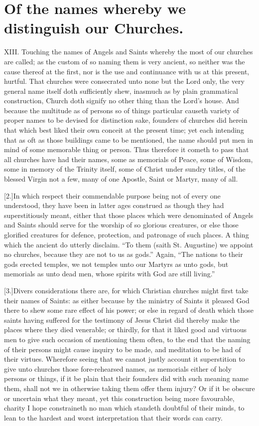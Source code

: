 \section*{Of the names whereby we distinguish our Churches.}
XIII. Touching the names of Angels and Saints whereby the most of our churches are called; as the custom of so naming them is very ancient, so neither was the cause thereof at the first, nor is the use and continuance with us at this present, hurtful. That churches were consecrated unto none but the Lord only, the very general name itself doth sufficiently shew, inasmuch as by plain grammatical construction, Church doth signify no other thing than the Lord’s house. And because the multitude as of persons so of things particular causeth variety of proper names to be devised for distinction sake, founders of churches did herein that which best liked their own conceit at the present time; yet each intending that as oft as those buildings came to be mentioned, the name should put men in mind of some memorable thing or person. Thus therefore it cometh to pass that all churches have had their names, some as memorials of Peace, some of Wisdom, some in memory of the Trinity itself, some of Christ under sundry titles, of the blessed Virgin not a few, many of one Apostle, Saint or Martyr, many of all.

[2.]In which respect their commendable purpose being not of every one understood, they have been in latter ages construed as though they had superstitiously meant, either that those places which were denominated of Angels and Saints should serve for the worship of so glorious creatures, or else those glorified creatures for defence, protection, and  patronage of such places. A thing which the ancient do utterly disclaim.
 “To them (saith St. Augustine) we appoint no churches, because they are not to us as gods.” Again, “The nations to their gods erected temples, we not temples unto our Martyrs as unto gods, but memorials as unto dead men, whose spirits with God are still living.”

[3.]Divers considerations there are, for which Christian churches might first take their names of Saints: as either because by the ministry of Saints it pleased God there to shew some rare effect of his power; or else in regard of death which those saints having suffered for the testimony of Jesus Christ did thereby make the places where they died venerable; or thirdly, for that it liked good and virtuous men to give such occasion of mentioning them often, to the end that the naming of their persons might cause inquiry to be made, and meditation to be had of their virtues. Wherefore seeing that we cannot justly account it superstition to give unto churches those fore-rehearsed names, as memorials either of holy persons or things, if it be plain that their founders did with such meaning name them, shall not we in otherwise taking them offer them injury? Or if it be obscure or uncertain what they meant, yet this construction being more  favourable, charity I hope constraineth no man which standeth doubtful of their minds, to lean to the hardest and worst interpretation that their words can carry.

